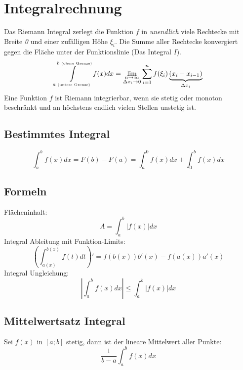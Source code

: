 \section{Integralrechnung}
Das Riemann Integral zerlegt die Funktion $f$ in \textit{unendlich} viele Rechtecke mit Breite \textit{0} und einer zufälligen Höhe $\xi_i$. Die Summe aller Rechtecke konvergiert gegen die Fläche unter der Funktionslinie (Das Integral $I$).
\[
\int\limits_{a \text{ \tiny(untere Grenze)}}^{b \text{ \tiny(obere Grenze)}}f(x)dx = \lim_{\substack{n\to\infty\\\Delta x_i\to 0}} \sum\limits_{i = 1}^{n}f(\xi_i)\underbrace{(x_i - x_{i-1})}_{\Delta x_i}
\]
\noindent Eine Funktion $f$ ist Riemann integrierbar, wenn sie stetig oder monoton beschränkt und an höchstens endlich vielen Stellen unstetig ist.

\subsection{Bestimmtes Integral}
\[\int_{a}^{b}f(x)dx = F(b) - F(a) = \int_{a}^{0}f(x)dx + \int_{0}^{b}f(x)dx\]

\subsection{Formeln}
\noindent Flächeninhalt: \[A = \int_{a}^{b}\left|f(x)\right|dx\]
\noindent Integral Ableitung mit Funktion-Limits: \[\left(\int_{a(x)}^{b(x)}f(t)dt\right)' = f(b(x))b'(x) - f(a(x))a'(x)\]
\noindent Integral Ungleichung:
\[\left|\int_{a}^{b}f(x)dx\right| \leq \int_{a}^{b}\left|f(x)\right|dx\]

\subsection{Mittelwertsatz Integral}
Sei $f(x)$ in $[a;b]$ stetig, dann ist der lineare Mittelwert aller Punkte:
\[\frac{1}{b-a}\int_{a}^{b}f(x)dx\]

